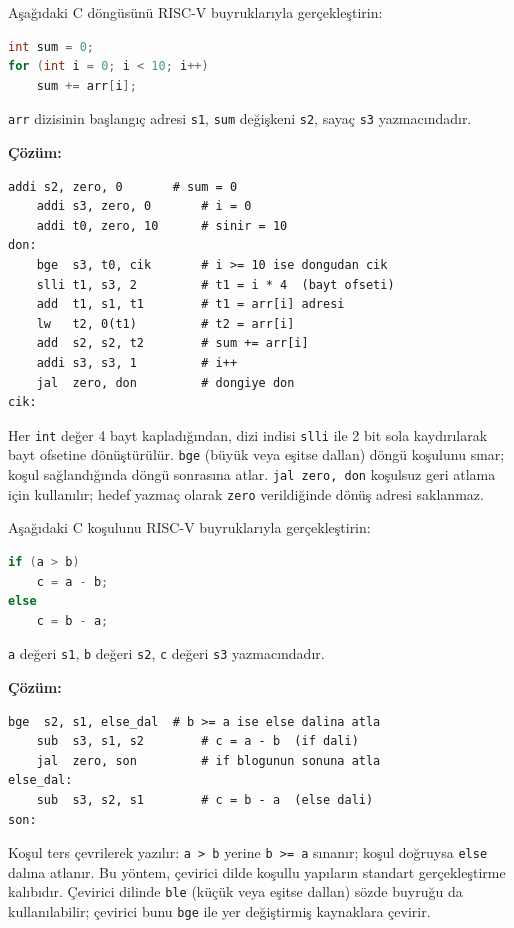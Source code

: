 \begin{ornek}[C.2]
\label{orn:ekc-dongu}
Aşağıdaki C döngüsünü RISC-V buyruklarıyla gerçekleştirin:
\begin{lstlisting}[language=C]
int sum = 0;
for (int i = 0; i < 10; i++)
    sum += arr[i];
\end{lstlisting}
\texttt{arr} dizisinin başlangıç adresi \texttt{s1}, \texttt{sum} değişkeni \texttt{s2}, sayaç \texttt{s3} yazmacındadır.

\textbf{Çözüm:}
\begin{lstlisting}[style=riscv]
    addi s2, zero, 0       # sum = 0
    addi s3, zero, 0       # i = 0
    addi t0, zero, 10      # sinir = 10
don:
    bge  s3, t0, cik       # i >= 10 ise dongudan cik
    slli t1, s3, 2         # t1 = i * 4  (bayt ofseti)
    add  t1, s1, t1        # t1 = arr[i] adresi
    lw   t2, 0(t1)         # t2 = arr[i]
    add  s2, s2, t2        # sum += arr[i]
    addi s3, s3, 1         # i++
    jal  zero, don         # dongiye don
cik:
\end{lstlisting}

Her \texttt{int} değer 4 bayt kapladığından, dizi indisi \texttt{slli} ile 2 bit sola kaydırılarak bayt ofsetine dönüştürülür. \texttt{bge} (büyük veya eşitse dallan) döngü koşulunu sınar; koşul sağlandığında döngü sonrasına atlar. \texttt{jal zero, don} koşulsuz geri atlama için kullanılır; hedef yazmaç olarak \texttt{zero} verildiğinde dönüş adresi saklanmaz.
\end{ornek}

\begin{ornek}[C.3]
\label{orn:ekc-kosul}
Aşağıdaki C koşulunu RISC-V buyruklarıyla gerçekleştirin:
\begin{lstlisting}[language=C]
if (a > b)
    c = a - b;
else
    c = b - a;
\end{lstlisting}
\texttt{a} değeri \texttt{s1}, \texttt{b} değeri \texttt{s2}, \texttt{c} değeri \texttt{s3} yazmacındadır.

\textbf{Çözüm:}
\begin{lstlisting}[style=riscv]
    bge  s2, s1, else_dal  # b >= a ise else dalina atla
    sub  s3, s1, s2        # c = a - b  (if dali)
    jal  zero, son         # if blogunun sonuna atla
else_dal:
    sub  s3, s2, s1        # c = b - a  (else dali)
son:
\end{lstlisting}

Koşul ters çevrilerek yazılır: \texttt{a > b} yerine \texttt{b >= a} sınanır; koşul doğruysa \texttt{else} dalına atlanır. Bu yöntem, çevirici dilde koşullu yapıların standart gerçekleştirme kalıbıdır. Çevirici dilinde \texttt{ble} (küçük veya eşitse dallan) sözde buyruğu da kullanılabilir; çevirici bunu \texttt{bge} ile yer değiştirmiş kaynaklara çevirir.
\end{ornek}


